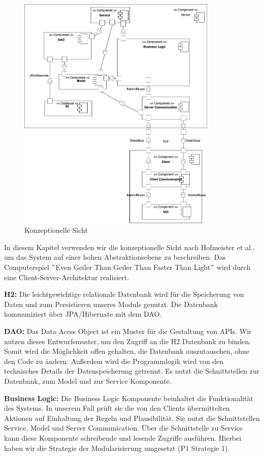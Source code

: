\documentclass[fontsize=12pt,paper=a4,twoside]{scrartcl}
\begin{document}
\begin{figure}[!ht]
	\centering
  \includegraphics[width=0.85\textwidth]{pics/Konzeptionelle_Sicht.png}
	\caption{Konzeptionelle Sicht}
	\label{fig1}
\end{figure}

In diesem Kapitel verwenden wir die konzeptionelle Sicht nach Hofmeister et al., um das System auf einer hohen Abstraktionsebene zu beschreiben.
Das Computerspiel $ " $Even Geiler Than Geiler Than Faster Than Light$ "$ wird durch eine Client-Server-Architektur realisiert.

\textbf{H2:} Die leichtgewichtige relationale Datenbank wird  für die Speicherung von Daten und zum Persistieren unseres Moduls genutzt. Die Datenbank kommuniziert über JPA/Hibernate mit dem DAO.

\textbf{DAO:}
Das Data Acess Object  ist  ein Muster für die Gestaltung von  APIs. 
Wir nutzen dieses Entwurfsmuster, um den Zugriff an die H2 Datenbank zu binden.
Somit wird die Möglichkeit offen gehalten, die Datenbank auszutauschen, ohne den Code zu ändern. Außerdem wird die Programmlogik wird von den  technisches Details der Datenspeicherung getrennt. Es nutzt die Schnittstellen zur Datenbank, zum Model und zur Service Komponente.

\textbf{Business Logic:} Die Business Logic Komponente beinhaltet die Funktionalität des Systems. In unserem Fall prüft sie die von den Clients übermittelten Aktionen auf Einhaltung der Regeln und Plausibilität.
Sie nutzt die Schnittstellen Service, Model und Server Communication.
Über die Schnittstelle zu Service kann diese Komponente schreibende und lesende Zugriffe ausführen. Hierbei haben wir die Strategie der Modularisierung umgesetzt (P1 Strategie 1).
\end{document}

